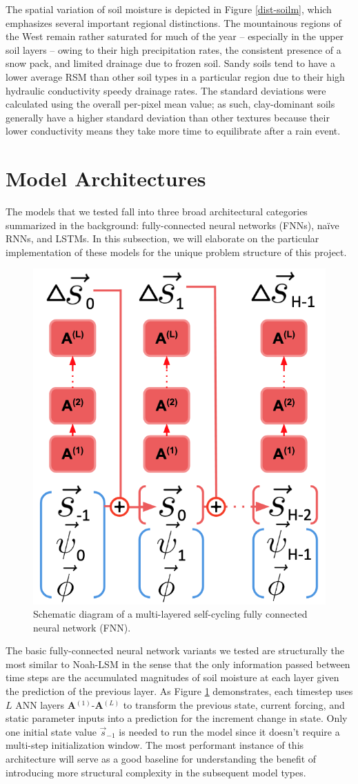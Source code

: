 The spatial variation of soil moisture is depicted in Figure \ref{dist-soilm}, which emphasizes several important regional distinctions. The mountainous regions of the West remain rather saturated for much of the year -- especially in the upper soil layers -- owing to their high precipitation rates, the consistent presence of a snow pack, and limited drainage due to frozen soil. Sandy soils tend to have a lower average RSM than other soil types in a particular region due to their high hydraulic conductivity speedy drainage rates. The standard deviations were calculated using the overall per-pixel mean value; as such, clay-dominant soils generally have a higher standard deviation than other textures because their lower conductivity means they take more time to equilibrate after a rain event.

\section{Model Architectures}

The models that we tested fall into three broad architectural categories summarized in the background: fully-connected neural networks (FNNs), na\"ive RNNs, and LSTMs. In this subsection, we will elaborate on the particular implementation of these models for the unique problem structure of this project.

\begin{figure}[h!]
    \centering
    \includegraphics[width=.4\linewidth]{figures/schematic_accfnn.png}
    \caption{Schematic diagram of a multi-layered self-cycling fully connected neural network (FNN).}
    \label{accfnn}
\end{figure}

The basic fully-connected neural network variants we tested are structurally the most similar to Noah-LSM in the sense that the only information passed between time steps are the accumulated magnitudes of soil moisture at each layer given the prediction of the previous layer. As Figure \ref{accfnn} demonstrates, each timestep uses $L$ ANN layers \textbf{A$^(1)$}-\textbf{A$^(L)$} to transform the previous state, current forcing, and static parameter inputs into a prediction for the increment change in state. Only one initial state value $\vec{s}_{-1}$ is needed to run the model since it doesn't require a multi-step initialization window. The most performant instance of this architecture will serve as a good baseline for understanding the benefit of introducing more structural complexity in the subsequent model types.

